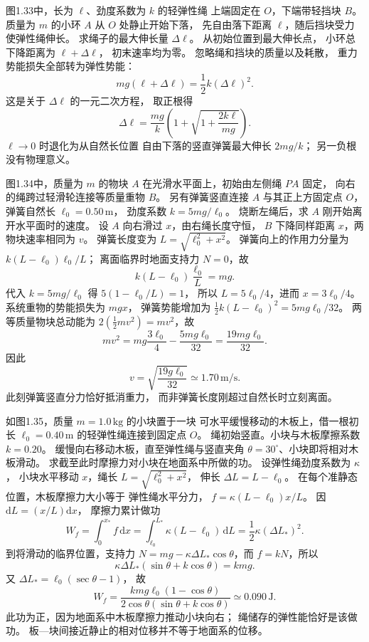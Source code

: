 图1.33中，长为 $\ell$、劲度系数为 $k$ 的轻弹性绳
上端固定在 $O$，下端带轻挡块 $B$。
质量为 $m$ 的小环 $A$ 从 $O$ 处静止开始下落，
先自由落下距离 $\ell$，随后挡块受力使弹性绳伸长。
求绳子的最大伸长量 $\Delta\ell$。
\exsolution
从初始位置到最大伸长点，
小环总下降距离为 $\ell+\Delta\ell$，
初末速率均为零。
忽略绳和挡块的质量以及耗散，
重力势能损失全部转为弹性势能：
\[
mg(\ell+\Delta\ell)=\frac12 k(\Delta\ell)^2.
\]
这是关于 $\Delta\ell$ 的一元二次方程，
取正根得
\[
\boxed{\Delta\ell=
\frac{mg}{k}\left(1+
\sqrt{1+\frac{2k\ell}{mg}}\right)}.
\]
\excheck $\ell\to0$ 时退化为从自然长位置
自由下落的竖直弹簧最大伸长 $2mg/k$；
另一负根没有物理意义。

图1.34中，质量为 $m$ 的物块 $A$
在光滑水平面上，初始由左侧绳 $PA$ 固定，
向右的绳跨过轻滑轮连接等质量重物 $B$。
另有弹簧竖直连接 $A$ 与其正上方固定点 $O$，
弹簧自然长 $\ell_0=0.50\,\mathrm m$，
劲度系数 $k=5mg/\ell_0$。
烧断左绳后，求 $A$ 刚开始离开水平面时的速度。
\exsolution
设 $A$ 向右滑过 $x$，由右绳长度守恒，
$B$ 下降同样距离 $x$，两物块速率相同为 $v$。
弹簧长度变为
$L=\sqrt{\ell_0^2+x^2}$。
弹簧向上的作用力分量为
$k(L-\ell_0)\ell_0/L$；
离面临界时地面支持力 $N=0$，故
\[
k(L-\ell_0)\frac{\ell_0}{L}=mg.
\]
代入 $k=5mg/\ell_0$ 得
$5(1-\ell_0/L)=1$，
所以 $L=5\ell_0/4$，进而
$x=3\ell_0/4$。
系统重物的势能损失为 $mgx$，
弹簧势能增加为
$\tfrac12 k(L-\ell_0)^2=5mg\ell_0/32$。
两等质量物块总动能为
$2(\tfrac12 mv^2)=mv^2$，故
\[
mv^2=mg\frac{3\ell_0}{4}
-\frac{5mg\ell_0}{32}
=\frac{19mg\ell_0}{32}.
\]
因此
\[
\boxed{v=\sqrt{\frac{19g\ell_0}{32}}
\simeq1.70\,\mathrm{m/s}}.
\]
\excheck 此刻弹簧竖直分力恰好抵消重力，
而非弹簧长度刚超过自然长时立刻离面。

如图1.35，质量 $m=1.0\,\mathrm{kg}$ 的小块置于一块
可水平缓慢移动的木板上，借一根初长
$\ell_0=0.40\,\mathrm m$ 的轻弹性绳连接到固定点 $O$。
绳初始竖直。小块与木板摩擦系数 $k=0.20$。
缓慢向右移动木板，直至弹性绳与竖直夹角
$\theta=30^\circ$、小块即将相对木板滑动。
求截至此时摩擦力对小块在地面系中所做的功。
\exsolution
设弹性绳劲度系数为 $\kappa$，
小块水平移动 $x$，绳长
$L=\sqrt{\ell_0^2+x^2}$，
伸长 $\Delta L=L-\ell_0$。
在每个准静态位置，木板摩擦力大小等于
弹性绳水平分力，
$f=\kappa(L-\ell_0)x/L$。
因 $\mathrm dL=(x/L)\mathrm dx$，
摩擦力累计做功
\[
W_f=\int_0^{x_*}f\,\mathrm dx
=\int_{\ell_0}^{L_*}\kappa(L-\ell_0)\,\mathrm dL
=\frac12\kappa(\Delta L_*)^2.
\]
到将滑动的临界位置，支持力
$N=mg-\kappa\Delta L_*\cos\theta$，而
$f=kN$，所以
\[
\kappa\Delta L_*(\sin\theta+k\cos\theta)=kmg.
\]
又 $\Delta L_*=\ell_0(\sec\theta-1)$，
故
\[
\boxed{W_f=
\frac{kmg\ell_0(1-\cos\theta)}
 {2\cos\theta(\sin\theta+k\cos\theta)}
\simeq0.090\,\mathrm J}.
\]
\excheck 此功为正，因为地面系中木板摩擦力推动小块向右；
绳储存的弹性能恰好是该做功。
板—块间接近静止的相对位移并不等于地面系的位移。

